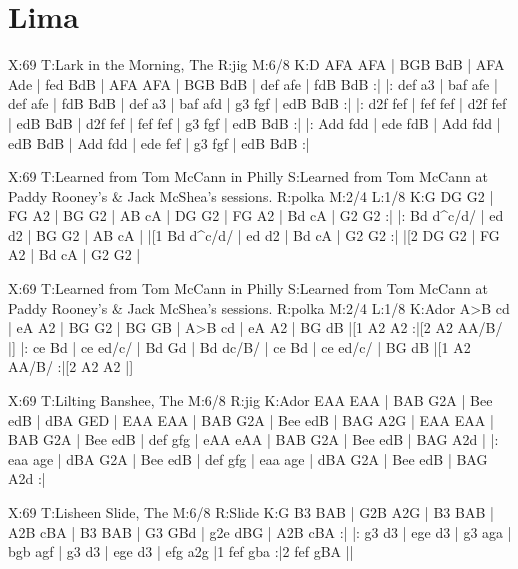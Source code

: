 \documentclass{article}
\begin{document}
\section{Lima}

\begin{abc}[name]
X:69
T:Lark in the Morning, The
R:jig
M:6/8
K:D
AFA AFA | BGB BdB | AFA Ade | fed BdB |
AFA AFA | BGB BdB | def afe | fdB BdB :|
|: def a3 | baf afe | def afe | fdB BdB |
def a3 | baf afd | g3 fgf | edB BdB :|
|: d2f fef | fef fef | d2f fef | edB BdB |
d2f fef | fef fef | g3 fgf | edB BdB :|
|: Add fdd | ede fdB | Add fdd | edB BdB |
Add fdd | ede fef | g3 fgf | edB BdB :|
\end{abc}

\begin{abc}[name]
X:69
T:Learned from Tom McCann in Philly
S:Learned from Tom McCann at Paddy Rooney's & Jack McShea's sessions.
R:polka
M:2/4
L:1/8
K:G
DG G2 | FG A2 | BG G2 | AB cA |
DG G2 | FG A2 | Bd cA | G2 G2 :|
|: Bd d^c/d/ | ed d2 | BG G2 | AB cA |
|[1 Bd d^c/d/ | ed d2 | Bd cA | G2 G2 :|
|[2 DG G2 | FG A2 | Bd cA | G2 G2 |
\end{abc}

\begin{abc}[name]
X:69
T:Learned from Tom McCann in Philly
S:Learned from Tom McCann at Paddy Rooney's & Jack McShea's sessions.
R:polka
M:2/4
L:1/8
K:Ador
A>B cd | eA A2 | BG G2 | BG GB |
A>B cd | eA A2 | BG dB |[1 A2 A2 :|[2 A2 AA/B/ |]
|: ce Bd | ce ed/c/ | Bd Gd | Bd dc/B/ |
ce Bd | ce ed/c/ | BG dB |[1 A2 AA/B/ :|[2 A2 A2 |]
\end{abc}

\begin{abc}[name]
X:69
T:Lilting Banshee, The
M:6/8
R:jig
K:Ador
EAA EAA | BAB G2A | Bee edB | dBA GED |
EAA EAA | BAB G2A | Bee edB | BAG A2G |
EAA EAA | BAB G2A | Bee edB | def gfg |
eAA eAA | BAB G2A | Bee edB | BAG A2d |
|: eaa age | dBA G2A | Bee edB | def gfg |
eaa age | dBA G2A | Bee edB | BAG A2d :|
\end{abc}

\begin{abc}[name]
X:69
T:Lisheen Slide, The
M:6/8
R:Slide
K:G
B3 BAB | G2B A2G | B3 BAB | A2B cBA | 
B3 BAB | G3 GBd | g2e dBG | A2B cBA :|
|: g3 d3 | ege d3 | g3 aga | bgb agf | 
g3 d3 | ege d3 | efg a2g |1 fef gba :|2 fef gBA ||
\end{abc}
\end{document}
